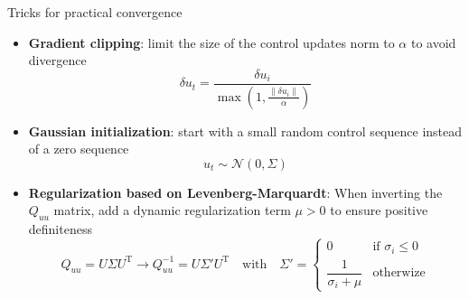 \documentclass[aspectratio=169,draft]{beamer}
\begin{document}
\begin{frame}{Tricks for practical convergence}
    \begin{itemize}
        \item \textbf{Gradient clipping}: limit the size of the control updates norm to $\alpha$ to avoid divergence
              \begin{equation*}
                  \delta u_t = \frac{\delta u_i}{\max\left(1, \frac{\|\delta u_i\|}{\alpha}\right)}
              \end{equation*}
        \item \textbf{Gaussian initialization}: start with a small random control sequence instead of a zero sequence
              \begin{equation*}
                  u_t \sim \mathcal{N}(0, \Sigma)
              \end{equation*}
        \item \textbf{Regularization based on Levenberg-Marquardt}: When inverting the $Q_{uu}$ matrix, add a dynamic regularization term $\mu > 0$ to ensure positive definiteness
              \begin{equation*}
                  Q_{uu} = U\Sigma U^{\mathrm{T}} \rightarrow Q_{uu}^{-1} = U\Sigma' U^{\mathrm{T}}
                  \quad\text{with}\quad
                  \Sigma' = \begin{cases}
                      0                         & \text{if $\sigma_i\leqslant 0$} \\
                      \dfrac{1}{\sigma_i + \mu} & \text{otherwize}
                  \end{cases}
              \end{equation*}
    \end{itemize}
\end{frame}
\end{document}

